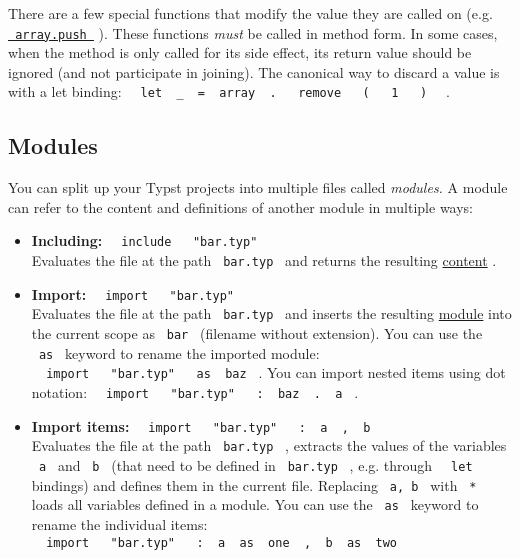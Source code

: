 There are a few special functions that modify the value they are called
on (e.g.
\href{/docs/reference/foundations/array/\#definitions-push}{\texttt{\ array.push\ }}
). These functions \emph{must} be called in method form. In some cases,
when the method is only called for its side effect, its return value
should be ignored (and not participate in joining). The canonical way to
discard a value is with a let binding:
\texttt{\ }{\texttt{\ let\ }}\texttt{\ \_\ }{\texttt{\ =\ }}\texttt{\ array\ }{\texttt{\ .\ }}\texttt{\ }{\texttt{\ remove\ }}\texttt{\ }{\texttt{\ (\ }}\texttt{\ }{\texttt{\ 1\ }}\texttt{\ }{\texttt{\ )\ }}\texttt{\ }
.

\subsection{Modules}\label{modules}

You can split up your Typst projects into multiple files called
\emph{modules.} A module can refer to the content and definitions of
another module in multiple ways:

\begin{itemize}
\item
  \textbf{Including:}
  \texttt{\ }{\texttt{\ include\ }}\texttt{\ }{\texttt{\ "bar.typ"\ }}\texttt{\ }\\
  Evaluates the file at the path \texttt{\ bar.typ\ } and returns the
  resulting \href{/docs/reference/foundations/content/}{content} .
\item
  \textbf{Import:}
  \texttt{\ }{\texttt{\ import\ }}\texttt{\ }{\texttt{\ "bar.typ"\ }}\texttt{\ }\\
  Evaluates the file at the path \texttt{\ bar.typ\ } and inserts the
  resulting \href{/docs/reference/foundations/module/}{module} into the
  current scope as \texttt{\ bar\ } (filename without extension). You
  can use the \texttt{\ as\ } keyword to rename the imported module:
  \texttt{\ }{\texttt{\ import\ }}\texttt{\ }{\texttt{\ "bar.typ"\ }}\texttt{\ }{\texttt{\ as\ }}\texttt{\ baz\ }
  . You can import nested items using dot notation:
  \texttt{\ }{\texttt{\ import\ }}\texttt{\ }{\texttt{\ "bar.typ"\ }}\texttt{\ }{\texttt{\ :\ }}\texttt{\ baz\ }{\texttt{\ .\ }}\texttt{\ a\ }
  .
\item
  \textbf{Import items:}
  \texttt{\ }{\texttt{\ import\ }}\texttt{\ }{\texttt{\ "bar.typ"\ }}\texttt{\ }{\texttt{\ :\ }}\texttt{\ a\ }{\texttt{\ ,\ }}\texttt{\ b\ }\\
  Evaluates the file at the path \texttt{\ bar.typ\ } , extracts the
  values of the variables \texttt{\ a\ } and \texttt{\ b\ } (that need
  to be defined in \texttt{\ bar.typ\ } , e.g. through
  \texttt{\ }{\texttt{\ let\ }}\texttt{\ } bindings) and defines them in
  the current file. Replacing \texttt{\ a,\ b\ } with \texttt{\ *\ }
  loads all variables defined in a module. You can use the
  \texttt{\ as\ } keyword to rename the individual items:
  \texttt{\ }{\texttt{\ import\ }}\texttt{\ }{\texttt{\ "bar.typ"\ }}\texttt{\ }{\texttt{\ :\ }}\texttt{\ a\ }{\texttt{\ as\ }}\texttt{\ one\ }{\texttt{\ ,\ }}\texttt{\ b\ }{\texttt{\ as\ }}\texttt{\ two\ }
\end{itemize}

